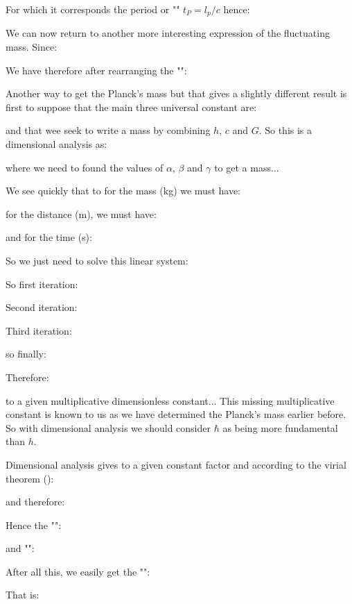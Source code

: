 	For which it corresponds the period or "" $t_P=l_p/c$ hence:
	
	We can now return to another more interesting expression of the fluctuating mass. Since:
	
	We have therefore after rearranging the "":
	
	Another way to get the Planck's mass but that gives a slightly different result is first to suppose that the main three universal constant are:
	
	and that wee seek to write a mass by combining $h$, $c$ and $G$. So this is a dimensional analysis as:
	
	where we need to found the values of $\alpha$, $\beta$ and $\gamma$ to get a mass...
	
	We see quickly that to for the mass (kg) we must have:
	
	for the distance (m), we must have:
	
	and for the time (s):
	
	So we just need to solve this linear system:
	
	So first iteration:
	
	Second iteration:
	
	Third iteration:
	
	so finally:
	
	Therefore:
	
	to a given multiplicative dimensionless constant... This missing multiplicative constant is known to us as we have determined the Planck's mass earlier before. So with dimensional analysis we should consider $\hbar$ as being more fundamental than $h$.
	
	Dimensional analysis gives to a given constant factor and according to the virial theorem ():
	
	and therefore:
	
	Hence the "":
	
	and "":
	
	After all this, we easily get the "":
	
	That is:
	
